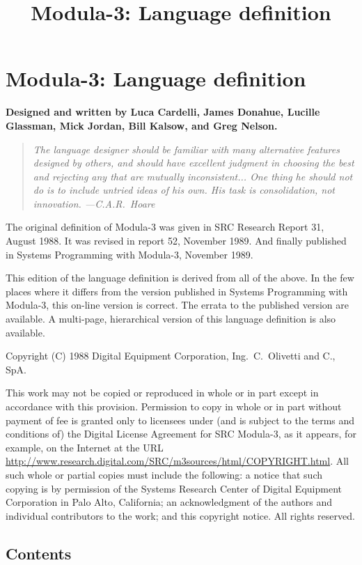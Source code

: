 \documentclass[10pt]{article}
\title{Modula-3: Language definition}
\begin{document}
\section*{Modula-3: Language definition}

\textbf{Designed and written by Luca Cardelli, James Donahue, Lucille
  Glassman, Mick Jordan, Bill Kalsow, and Greg Nelson.}

\begin{quote}
  \emph{The language designer should be familiar with many alternative
    features designed by others, and should have excellent judgment in
    choosing the best and rejecting any that are mutually inconsistent... One
    thing he should not do is to include untried ideas of his own.  His task is
    consolidation, not innovation.  ---C.A.R.\ Hoare}
\end{quote}

The original definition of Modula-3 was given in SRC Research Report 31,
August 1988.  It was revised in report 52, November 1989.  And finally
published in Systems Programming with Modula-3, November 1989.

This edition of the language definition is derived from all of the above.  In
the few places where it differs from the version published in Systems
Programming with Modula-3, this on-line version is correct.  The errata to the
published version are available.  A multi-page, hierarchical version of this
language definition is also available.

Copyright (C) 1988 Digital Equipment Corporation, Ing.\ C.\ Olivetti and C.,
SpA.

This work may not be copied or reproduced in whole or in part except in
accordance with this provision.  Permission to copy in whole or in part
without payment of fee is granted only to licensees under (and is subject to
the terms and conditions of) the Digital License Agreement for SRC Modula-3,
as it appears, for example, on the Internet at the URL
\url{http://www.research.digital.com/SRC/m3sources/html/COPYRIGHT.html}.  All
such whole or partial copies must include the following: a notice that such
copying is by permission of the Systems Research Center of Digital Equipment
Corporation in Palo Alto, California; an acknowledgment of the authors and
individual contributors to the work; and this copyright notice.  All rights
reserved.

\subsection*{Contents}
\end{document}
